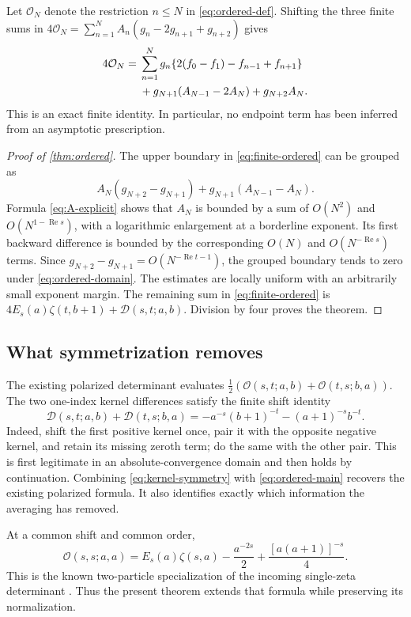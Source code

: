 \documentclass[11pt,a4paper]{article}
\numberwithin{equation}{section}
\theoremstyle{definition}
\theoremstyle{remark}
\newcommand{\Rea}{\operatorname{Re}}
\newcommand{\Ord}{\mathcal O}
\newcommand{\Def}{\mathcal D}
\begin{document}
Let $\Ord_N$ denote the restriction $n\le N$ in
\eqref{eq:ordered-def}. Shifting the three finite sums in
$4\Ord_N=\sum_{n=1}^N A_n(g_n-2g_{n+1}+g_{n+2})$ gives
\begin{align}\label{eq:finite-ordered}
 4\Ord_N={}&\sum_{n=1}^{N}g_n
              \{2(f_0-f_1)-f_{n-1}+f_{n+1}\}\notag\\
 &+g_{N+1}(A_{N-1}-2A_N)+g_{N+2}A_N.
\end{align}
This is an exact finite identity. In particular, no endpoint term
has been inferred from an asymptotic prescription.

\begin{proof}[Proof of \cref{thm:ordered}]
The upper boundary in \eqref{eq:finite-ordered} can be grouped as
\[
 A_N(g_{N+2}-g_{N+1})+g_{N+1}(A_{N-1}-A_N).
\]
Formula \eqref{eq:A-explicit} shows that $A_N$ is bounded by a sum
of $O(N^2)$ and $O(N^{1-\Rea s})$, with a logarithmic enlargement
at a borderline exponent. Its first backward difference is bounded
by the corresponding $O(N)$ and $O(N^{-\Rea s})$ terms.
Since $g_{N+2}-g_{N+1}=O(N^{-\Rea t-1})$, the grouped boundary
tends to zero under \eqref{eq:ordered-domain}. The estimates are
locally uniform with an arbitrarily small exponent margin.
The remaining sum in \eqref{eq:finite-ordered} is
$4E_s(a)\zeta(t,b+1)+\Def(s,t;a,b)$.
Division by four proves the theorem.
\end{proof}

\subsection{What symmetrization removes}

The existing polarized determinant evaluates
$\tfrac12(\Ord(s,t;a,b)+\Ord(t,s;b,a))$.
The two one-index kernel differences satisfy the finite shift identity
\begin{equation}\label{eq:kernel-symmetry}
 \Def(s,t;a,b)+\Def(t,s;b,a)
 =-a^{-s}(b+1)^{-t}-(a+1)^{-s}b^{-t}.
\end{equation}
Indeed, shift the first positive kernel once, pair it with the
opposite negative kernel, and retain its missing zeroth term;
do the same with the other pair. This is first legitimate in an
absolute-convergence domain and then holds by continuation.
Combining \eqref{eq:kernel-symmetry} with \eqref{eq:ordered-main}
recovers the existing polarized formula. It also identifies exactly
which information the averaging has removed.

At a common shift and common order,
\begin{equation}\label{eq:diagonal-recovery}
 \Ord(s,s;a,a)=E_s(a)\zeta(s,a)
                  -\frac{a^{-2s}}2+
                     \frac{[a(a+1)]^{-s}}4.
\end{equation}
This is the known two-particle specialization of the incoming
single-zeta determinant \cite{repo:finite}. Thus the present theorem
extends that formula while preserving its normalization.
\end{document}

